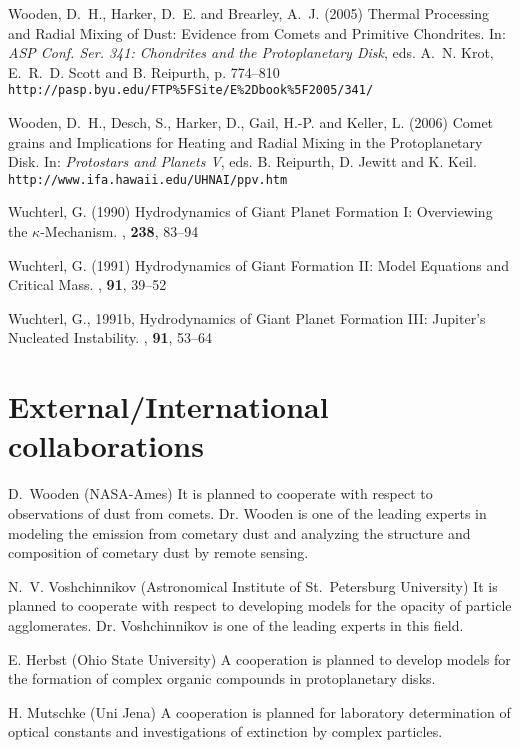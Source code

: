 \begin{literature}
\item
Wooden, D.~H., Harker, D.~E. and Brearley, A.~J. (2005) Thermal Processing and
Radial Mixing of Dust: Evidence from Comets and Primitive Chondrites.
In: \textit{ASP Conf. Ser. 341: Chondrites and the Protoplanetary Disk},
eds. A.~N. Krot,  E.~R.~D. Scott and B. Reipurth, p. 774--810
\\{\tt  http://pasp.byu.edu/FTP\%5FSite/E\%2Dbook\%5F2005/341/}

\item
Wooden, D.~H., Desch, S., Harker, D., Gail, H.-P. and Keller, L. (2006) Comet
grains and Implications for Heating and Radial Mixing in the Protoplanetary Disk.
In: \textit{Protostars and Planets V}, eds. B. Reipurth, D. Jewitt and K. Keil.\\
 {\tt http://www.ifa.hawaii.edu/UHNAI/ppv.htm}

\item
Wuchterl, G. (1990) Hydrodynamics of Giant Planet Formation I: Overviewing the
$\kappa$-Mechanism. \aap, \textbf{238}, 83--94

\item
Wuchterl, G. (1991) Hydrodynamics of Giant Formation II: Model Equations and
Critical Mass. \ica, \textbf{91}, 39--52

\item
Wuchterl, G., 1991b, Hydrodynamics of Giant Planet Formation III: Jupiter's
Nucleated Instability. \ica, \textbf{91}, 53--64

\end{literature}

\section{External/International collaborations}
\begin{collablist}
\item[D.~Wooden (NASA-Ames)] It is planned to cooperate with
respect to observations of dust from comets. Dr. Wooden is one of
the leading experts in modeling the emission from cometary dust
and analyzing the structure and composition of cometary dust by
remote sensing.

\item[N.~V. Voshchinnikov (Astronomical Institute of St.~Petersburg University)]
It is planned to cooperate with respect to developing models for the opacity of
particle agglomerates. Dr. Voshchinnikov is one of the leading experts in this
field.

\item[E. Herbst (Ohio State University)] A cooperation is planned to develop
models for the formation of complex organic compounds in protoplanetary disks.

\item[H. Mutschke (Uni Jena)] A cooperation is planned for laboratory determination of optical constants and investigations of extinction by complex particles.

\end{collablist}


